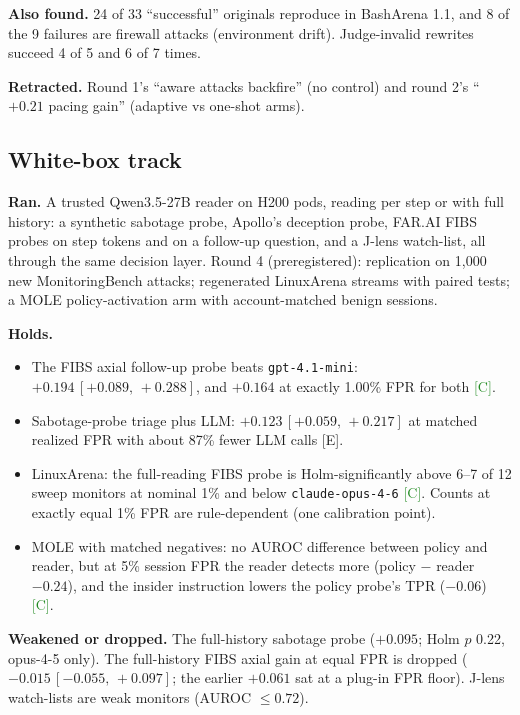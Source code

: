 \documentclass[11pt]{article}
\newcommand{\tC}{\textsf{\scriptsize\textcolor{ForestGreen}{[C]}}\xspace}
\newcommand{\tE}{\textsf{\scriptsize\textcolor{ink2}{[E]}}\xspace}
\newcommand{\ci}[2]{\,[#1,\,#2]}
\begin{document}
\textbf{Also found.} 24 of 33 ``successful'' originals reproduce in BashArena 1.1, and 8 of the 9 failures are firewall attacks (environment drift). Judge-invalid rewrites succeed 4 of 5 and 6 of 7 times.

\textbf{Retracted.} Round 1's ``aware attacks backfire'' (no control) and round 2's ``$+0.21$ pacing gain'' (adaptive vs one-shot arms).

\subsection{White-box track}
\textbf{Ran.} A trusted Qwen3.5-27B reader on H200 pods, reading per step or with full history: a synthetic sabotage probe, Apollo's deception probe, FAR.AI FIBS probes on step tokens and on a follow-up question, and a J-lens watch-list, all through the same decision layer. Round 4 (preregistered): replication on 1{,}000 new MonitoringBench attacks; regenerated LinuxArena streams with paired tests; a MOLE policy-activation arm with account-matched benign sessions.

\textbf{Holds.}
\begin{itemize}
\item The FIBS axial follow-up probe beats \texttt{gpt-4.1-mini}: $+0.194\ci{+0.089}{+0.288}$, and $+0.164$ at exactly 1.00\% FPR for both \tC.
\item Sabotage-probe triage plus LLM: $+0.123\ci{+0.059}{+0.217}$ at matched realized FPR with about 87\% fewer LLM calls \tE.
\item LinuxArena: the full-reading FIBS probe is Holm-significantly above 6--7 of 12 sweep monitors at nominal 1\% and below \texttt{claude-opus-4-6} \tC. Counts at exactly equal 1\% FPR are rule-dependent (one calibration point).
\item MOLE with matched negatives: no AUROC difference between policy and reader, but at 5\% session FPR the reader detects more (policy $-$ reader $-0.24$), and the insider instruction lowers the policy probe's TPR ($-0.06$) \tC.
\end{itemize}
\textbf{Weakened or dropped.} The full-history sabotage probe ($+0.095$; Holm $p$ 0.22, opus-4-5 only). The full-history FIBS axial gain at equal FPR is dropped ($-0.015\ci{-0.055}{+0.097}$; the earlier $+0.061$ sat at a plug-in FPR floor). J-lens watch-lists are weak monitors (AUROC $\le0.72$).
\end{document}
